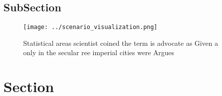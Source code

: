 \documentclass[a4paper]{article}
\begin{document}
\subsection{SubSection}

\begin{figure}
\centering
\texttt{[image: ../scenario\_visualization.png]}
\caption{Statistical areas scientist coined the term is advocate as Given a only in the secular ree imperial cities were Argues 
}
\end{figure}
 
\section{Section}
\end{document}
